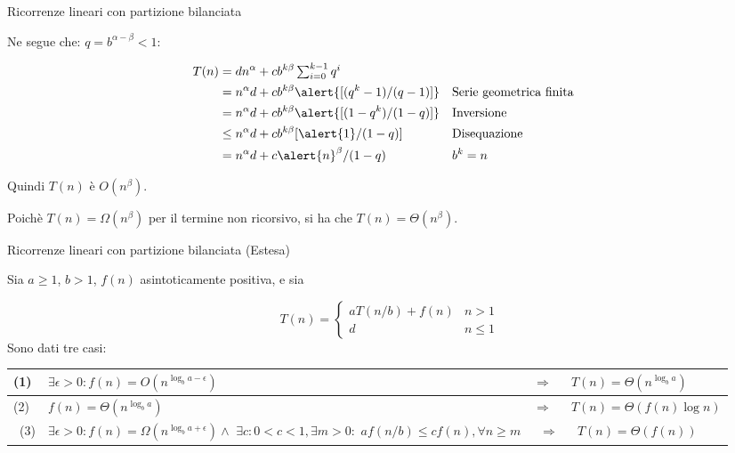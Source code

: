 \begin{frame}{Ricorrenze lineari con partizione bilanciata}
	

Ne segue che: $q = b^{\alpha-\beta} < 1$:

\begin{align*}
T(n) &= dn^\alpha  + cb^{k\beta} \textstyle\sum_{i=0}^{k-1} q^i \\
&= n^\alpha d + cb^{k\beta} \alert{[(q^k-1)/(q-1)]} && \textrm{Serie geometrica finita}\\
&= n^\alpha d + cb^{k\beta} \alert{[(1 - q^k)/(1 - q)]} && \textrm{Inversione}\\
&\le n^\alpha d + cb^{k\beta} [\alert{1}/(1 - q)] && \textrm{Disequazione}\\
&= n^\alpha d + c\alert{n}^\beta/(1 - q) && b^k=n
\end{align*}

\BIL
\item Quindi $T(n)$ è $O(n^\beta)$. 
\item Poichè $T(n) = \Omega(n^\beta)$ per il termine non ricorsivo, si ha che
$T(n) = \Theta(n^\beta)$. 
\EIL

\end{frame}




\begin{frame}{Ricorrenze lineari con partizione bilanciata (Estesa)}

\begin{myboxtitle}[Teorema]
Sia $a \geq 1$, $b > 1$, $f(n)$ asintoticamente positiva, e sia 

\[
T(n) = \begin{cases}
     a T(n/b) + f(n) & n > 1 \\
     d & n \leq 1
  \end{cases} 
\]
Sono dati tre casi:

\vspace{-12pt}
\bgroup
\begin{center}
\def\arraystretch{1.5}
\begin{tabular}{|P{0.5cm}|P{5cm}P{0.4cm}P{3.7cm}|}
\hline
(1) & $\exists \epsilon>0: f(n) = O(n^{\log_b a - \epsilon})$ & $\Rightarrow$ & $T(n) = \Theta(n^{\log_b a})$\\
\hline
(2) & $f(n) = \Theta(n^{\log_b a})$ & $\Rightarrow$ & $T(n) = \Theta(f(n) \log n)$ \\
\hline
~\newline(3) & $\exists \epsilon>0: f(n) = \Omega(n^{\log_b a + \epsilon}) \wedge {}$\newline
$\exists c: 0 < c < 1, \exists m>0:$  \newline
$af(n/b) \leq cf(n), \forall n \geq m$
& ~\newline $\Rightarrow$ 
& ~\newline $T(n) = \Theta(f(n))$\\
\hline
\end{tabular}
\end{center}
\egroup

\end{myboxtitle}

\end{frame}

